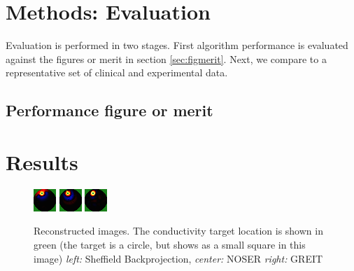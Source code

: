 \documentclass[12pt]{iopart}
\begin{document}
\section{Methods: Evaluation}

Evaluation is performed in two stages. First algorithm performance
is evaluated against the figures or merit in section
\ref{sec:figmerit}.
Next, we compare to a representative set of  clinical 
and experimental data.

\subsection{Performance figure or merit}


\section{Results}

\begin{figure}[bhtp]
\begin{center}
  \includegraphics[width= 0.2 \textwidth, bb=0 0 32 32]
         {../../tutorial/GREIT-evaluation/simulation_test_imgs/simulation_test03_1.png}
  \includegraphics[width= 0.2 \textwidth, bb=0 0 32 32]
         {../../tutorial/GREIT-evaluation/simulation_test_imgs/simulation_test03_2.png}
  \includegraphics[width= 0.2 \textwidth, bb=0 0 32 32]
         {../../tutorial/GREIT-evaluation/simulation_test_imgs/simulation_test03_4.png}
\caption{ \label{fig:rimage}
Reconstructed images. The conductivity target location is shown in green (the target is a circle, but shows as a small square in this image)
{\em left:} Sheffield Backprojection,
{\em center:} NOSER
{\em right:} GREIT
}
\end{center}
\end{figure}
\end{document}
